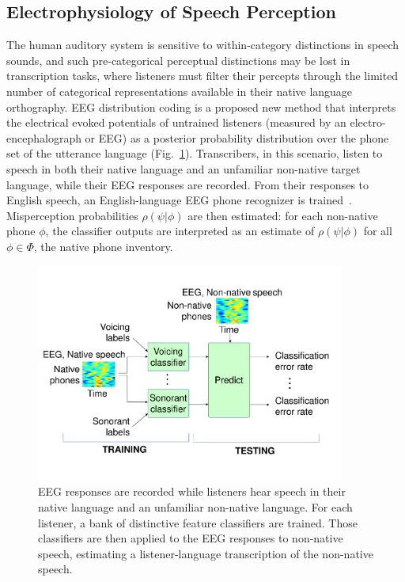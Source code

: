\subsection{Electrophysiology of Speech Perception}

The human auditory system is sensitive to within-category distinctions
in speech sounds, and such pre-categorical perceptual distinctions may
be lost in transcription tasks, where listeners must filter their
percepts through the limited number of categorical representations
available in their native language orthography.  EEG distribution
coding is a proposed new method that interprets the electrical evoked
potentials of untrained listeners (measured by an
electro-encephalograph or EEG) as a posterior probability distribution
over the phone set of the utterance language
(Fig.~\ref{fig:eeg_paradigm}).  Transcribers, in this scenario, listen
to speech in both their native language and an unfamiliar non-native
target language, while their EEG responses are recorded.  From their
responses to English speech, an English-language EEG phone recognizer
is trained~\cite{Liberto15}.  Misperception probabilities
$\rho(\psi|\phi)$ are then estimated: for each non-native phone
$\phi$, the classifier outputs are interpreted as an estimate of
$\rho(\psi|\phi)$ for all $\phi\in\mathbb{\Phi}$, the native phone
inventory.

\begin{figure}
  \centerline{\includegraphics[width=4in]{../figs/Slide2JSALT.pdf}}
  \caption{EEG responses are recorded while listeners hear speech in
    their native language and an unfamiliar non-native language.  For 
    each listener, a bank of distinctive feature classifiers are trained. 
    Those classifiers are then applied to the EEG responses to non-native
    speech, estimating a listener-language transcription of the
    non-native speech.}
  \label{fig:eeg_paradigm}
\end{figure}
